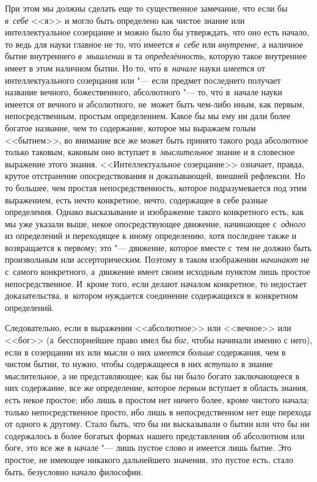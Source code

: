 При этом мы должны сделать еще то существенное замечание, что если бы
{\em в~себе} <<я>> и могло быть определено как чистое знание или
интеллектуальное созерцание и можно было бы утверждать, что оно есть начало, то
ведь для науки главное не то, чт\'{о} имеется {\em в~себе} или {\em внутренне,}
а наличное бытие внутреннего {\em в~мышлении} и та {\em определённость,}
которую такое внутреннее имеет в этом наличном бытии. Но то, чт\'{о}
в~{\em начале} науки {\em имеется} от интеллектуального созерцания или "---
если предмет последнего получает название вечного, божественного, абсолютного
"--- то, чт\'{о} в~начале науки имеется от вечного и абсолютного, не~может быть
чем-либо иным, как первым, непосредственным, простым определением. Какое бы мы
ему ни дали более богатое название, чем то содержание, которое мы выражаем
голым <<бытием>>, во внимание все же может быть принято такого рода абсолютное
только таковым, каковым оно вступает в~{\em мыслительное} знание и в словесное
выражение этого знания. <<Интеллектуальное созерцание>> означает, правда,
крутое отстранение опосредствования и доказывающей, внешней рефлексии. Но то
большее, чем простая непосредственность, которое подразумевается под этим
выражением, есть нечто конкретное, нечто, содержащее в себе разные определения.
Однако высказывание и изображение такого конкретного есть, как мы уже указали
выше, некое опосредствующее движение, начинающее с~{\em одного} из определений
и переходящее к иному определению, хотя последнее также и возвращается к
первому; это "--- движение, которое вместе с~тем не должно быть произвольным
или ассерторическим. Поэтому в таком изображении {\em начинают} не с~самого
конкретного, а~движение имеет своим исходным пунктом лишь простое
непосредственное. И~кроме того, если делают началом конкретное, то недостает
доказательства, в~котором нуждается соединение содержащихся в~конкретном
определений.

Следовательно, если в выражении <<абсолютное>> или <<вечное>> или <<бог>>
(а~бесспорнейшее право имел бы {\em бог,} чтобы начинали именно с него), если
в созерцании их или мысли о них {\em имеется больше} содержания, чем в чистом
бытии, то нужно, чтобы содержащееся в них {\em вступило} в знание мыслительное,
а не представляющее; как бы ни было богато заключающееся в них содержание, все
же определение, которое {\em первым} вступает в область знания, есть некое
простое; ибо лишь в простом нет ничего более, кроме чистого начала; только
непосредственное просто, ибо лишь в непосредственном нет еще перехода от одного
к другому. Стало быть, что бы ни высказывали о бытии или что бы ни содержалось
в более богатых формах нашего представления об абсолютном или боге, это все же
в начале "--- лишь пустое слово и имеется лишь бытие. Это простое, не имеющее
никакого дальнейшего значения, это пустое есть, стало быть, безусловно начало
философии.

